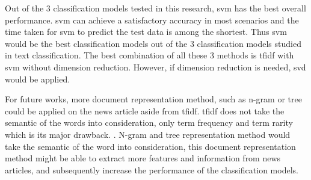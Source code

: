 Out of the 3 classification models tested in this research, \ac{svm} has the best overall performance. \Ac{svm} can achieve a satisfactory accuracy in most scenarios and the time taken for \ac{svm} to predict the test data is among the shortest. Thus \ac{svm} would be the best classification models out of the 3 classification models studied in text classification. The best combination of all these 3 methods is \ac{tfidf} with \ac{svm} without dimension reduction. However, if dimension reduction is needed, \ac{svd} would be applied.

For future works, more document representation method, such as n-gram or tree could be applied on the news article aside from \ac{tfidf}. \Ac{tfidf} does not take the semantic of the words into consideration, only term frequency and term rarity which is its major drawback. \cite{tfidfDrawback}. N-gram and tree representation method would take the semantic of the word into consideration, this document representation method might be able to extract more features and information from news articles, and subsequently increase the performance of the classification models.\\

